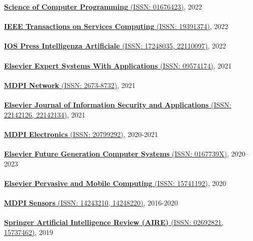 \href{https://www.sciencedirect.com/journal/science-of-computer-programming}{\textbf{Science of Computer Programming} (ISSN: 01676423)}, 2022
\\ \halfblankline \\
\href{https://www.computer.org/csdl/journal/sc}{\textbf{IEEE Transactions on Services Computing} (ISSN: 19391374)}, 2022
\\ \halfblankline \\
\href{https://www.iospress.com/catalog/journals/intelligenza-artificiale}{\textbf{IOS Press Intelligenza Artificiale} (ISSN: 17248035, 22110097)}, 2022
\\ \halfblankline \\
\href{https://www.journals.elsevier.com/expert-systems-with-applications}{\textbf{Elsevier Expert Systems With Applications} (ISSN: 09574174)}, 2021
\\ \halfblankline \\
\href{https://www.mdpi.com/journal/network}{\textbf{MDPI Network} (ISSN: 2673-8732)}, 2021
\\ \halfblankline \\
\href{https://www.journals.elsevier.com/journal-of-information-security-and-applications}{\textbf{Elsevier Journal of Information Security and Applications} (ISSN: 22142126, 22142134)}, 2021
\\ \halfblankline \\
\href{https://www.mdpi.com/journal/electronics}{\textbf{MDPI Electronics} (ISSN: 20799292)}, 2020-2021
\\ \halfblankline \\
\href{https://www.sciencedirect.com/journal/future-generation-computer-systems}{\textbf{Elsevier Future Generation Computer Systems} (ISSN: 0167739X)}, 2020--2023
\\ \halfblankline \\
\href{https://www.journals.elsevier.com/pervasive-and-mobile-computing}{\textbf{Elsevier Pervasive and Mobile Computing} (ISSN: 15741192)}, 2020
\\ \halfblankline \\
\href{http://www.mdpi.com/journal/sensors}{\textbf{MDPI Sensors} (ISSN: 14243210, 14248220)}, 2016-2020
\\ \halfblankline \\
\href{https://link.springer.com/journal/10462}{\textbf{Springer Artificial Intelligence Review (AIRE)} (ISSN: 02692821, 15737462)}, 2019
\\ \halfblankline \\
